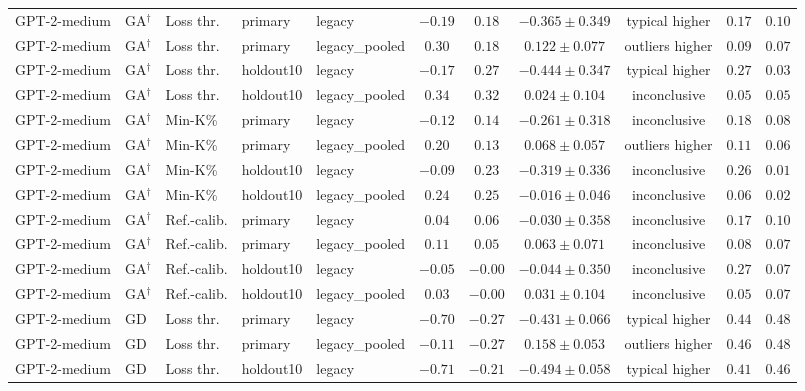 {\begin{longtable}{@{\extracolsep{\fill}}lllllcccccc@{}}
GPT-2-medium & GA$^{\dagger}$ & Loss thr. & primary & legacy & $-0.19$ & $0.18$ & $-0.365 \pm 0.349$ & typical higher & $0.17$ & $0.10$ \\
GPT-2-medium & GA$^{\dagger}$ & Loss thr. & primary & legacy\_pooled & $0.30$ & $0.18$ & $0.122 \pm 0.077$ & outliers higher & $0.09$ & $0.07$ \\
GPT-2-medium & GA$^{\dagger}$ & Loss thr. & holdout10 & legacy & $-0.17$ & $0.27$ & $-0.444 \pm 0.347$ & typical higher & $0.27$ & $0.03$ \\
GPT-2-medium & GA$^{\dagger}$ & Loss thr. & holdout10 & legacy\_pooled & $0.34$ & $0.32$ & $0.024 \pm 0.104$ & inconclusive & $0.05$ & $0.05$ \\
GPT-2-medium & GA$^{\dagger}$ & Min-K\% & primary & legacy & $-0.12$ & $0.14$ & $-0.261 \pm 0.318$ & inconclusive & $0.18$ & $0.08$ \\
GPT-2-medium & GA$^{\dagger}$ & Min-K\% & primary & legacy\_pooled & $0.20$ & $0.13$ & $0.068 \pm 0.057$ & outliers higher & $0.11$ & $0.06$ \\
GPT-2-medium & GA$^{\dagger}$ & Min-K\% & holdout10 & legacy & $-0.09$ & $0.23$ & $-0.319 \pm 0.336$ & inconclusive & $0.26$ & $0.01$ \\
GPT-2-medium & GA$^{\dagger}$ & Min-K\% & holdout10 & legacy\_pooled & $0.24$ & $0.25$ & $-0.016 \pm 0.046$ & inconclusive & $0.06$ & $0.02$ \\
GPT-2-medium & GA$^{\dagger}$ & Ref.-calib. & primary & legacy & $0.04$ & $0.06$ & $-0.030 \pm 0.358$ & inconclusive & $0.17$ & $0.10$ \\
GPT-2-medium & GA$^{\dagger}$ & Ref.-calib. & primary & legacy\_pooled & $0.11$ & $0.05$ & $0.063 \pm 0.071$ & inconclusive & $0.08$ & $0.07$ \\
GPT-2-medium & GA$^{\dagger}$ & Ref.-calib. & holdout10 & legacy & $-0.05$ & $-0.00$ & $-0.044 \pm 0.350$ & inconclusive & $0.27$ & $0.07$ \\
GPT-2-medium & GA$^{\dagger}$ & Ref.-calib. & holdout10 & legacy\_pooled & $0.03$ & $-0.00$ & $0.031 \pm 0.104$ & inconclusive & $0.05$ & $0.07$ \\
GPT-2-medium & GD & Loss thr. & primary & legacy & $-0.70$ & $-0.27$ & $-0.431 \pm 0.066$ & typical higher & $0.44$ & $0.48$ \\
GPT-2-medium & GD & Loss thr. & primary & legacy\_pooled & $-0.11$ & $-0.27$ & $0.158 \pm 0.053$ & outliers higher & $0.46$ & $0.48$ \\
GPT-2-medium & GD & Loss thr. & holdout10 & legacy & $-0.71$ & $-0.21$ & $-0.494 \pm 0.058$ & typical higher & $0.41$ & $0.46$ \\

\end{longtable}}
